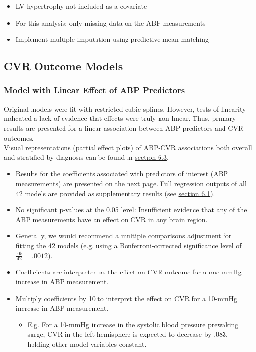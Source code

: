 \documentclass[10pt]{article}\usepackage[]{graphicx}\usepackage[]{color}
\begin{document}
\begin{itemize}
  \item LV hypertrophy not included as a covariate
  \item For this analysis: only missing data on the ABP measurements
  \item Implement multiple imputation using predictive mean matching
\end{itemize}




\clearpage
\subsection{CVR Outcome Models}

\subsubsection{Model with Linear Effect of ABP Predictors}
Original models were fit with restricted cubic splines. However, tests of linearity indicated a lack of evidence that effects were truly non-linear. Thus, primary results are presented for a linear association between ABP predictors and CVR outcomes. \\

Visual representations (partial effect plots) of ABP-CVR associations both overall and stratified by diagnosis can be found in \hyperref[sec:PEP]{section 6.3}.

\begin{itemize}
  \item Results for the coefficients associated with predictors of interest (ABP measurements) are presented on the next page. Full regression outputs of all 42 models are provided as supplementary results (see \hyperref[sec:fullOutput]{section 6.1}).
  \item No significant p-values at the 0.05 level: Insufficient evidence that any of the ABP measurements have an effect on CVR in any brain region.
  \item Generally, we would recommend a multiple comparisons adjustment for fitting the 42 models (e.g. using a Bonferroni-corrected significance level of $\frac{.05}{42} = .0012$).
  \item Coefficients are interpreted as the effect on CVR outcome for a one-mmHg increase in ABP measurement. 
  \item Multiply coefficients by 10 to interpret the effect on CVR for a 10-mmHg increase in ABP measurement.
  \begin{itemize}
    \item E.g. For a 10-mmHg increase in the systolic blood pressure prewaking surge, CVR in the left hemisphere is expected to decrease by .083, holding other model variables constant. 
  \end{itemize}
\end{itemize}
\end{document}
